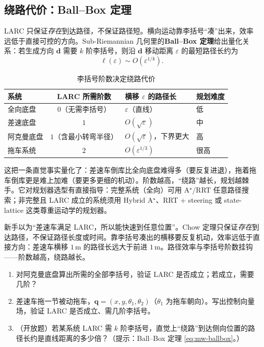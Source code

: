 \subsection{绕路代价：Ball--Box 定理}
\label{sec:mw-ballbox}

LARC 只保证\emph{存在}到达路径，不保证路径短。横向运动靠李括号“凑”出来，效率远低于直接可控的方向。Sub-Riemannian 几何里的\textbf{Ball--Box 定理}给出量化关系：若生成方向 $\mathbf{d}$ 需要 $k$ 阶李括号，则沿 $\mathbf{d}$ 移动距离 $\varepsilon$ 的最短路径长约为
\begin{equation}
  \ell(\varepsilon)\sim O\!\left(\varepsilon^{1/k}\right).
  \label{eq:mw-ballbox}
\end{equation}

\begin{table}[H]\centering\small
\caption{李括号阶数决定绕路代价}
\begin{tabular}{lcll}
\toprule
系统 & LARC 所需阶数 & 横移 $\varepsilon$ 的路径长 & 规划难度 \\
\midrule
全向底盘 & $0$（无需李括号） & $\varepsilon$（直线） & 低 \\
差速底盘 & $1$ & $O(\sqrt{\varepsilon})$ & 中 \\
阿克曼底盘 & $1$（含最小转弯半径） & $O(\sqrt{\varepsilon})$，下界更大 & 高 \\
拖车系统 & $2$ & $O(\varepsilon^{1/3})$ & 很高 \\
\bottomrule
\end{tabular}
\end{table}

\noindent 这把一条直觉事实量化了：差速车倒库比全向底盘难得多（要反复进退），拖着拖车倒库更是难上加难（要更多更细的机动）。阶数越高，“绕路”越长，规划越棘手。它对规划器选型有直接指导：完整系统（全向）可用 A$^\star$/RRT 任意路径搜索；非完整且 LARC 成立的系统须用 Hybrid A$^\star$、RRT + steering 或 state-lattice 这类尊重运动学的规划器。

\begin{pitfall}
新手以为“差速车满足 LARC，所以能快速到任意位置”。Chow 定理只保证\emph{存在}到达路径，不保证路径长度或时间。靠李括号凑出的横移要反复机动，效率远低于直接方向：差速车横移 $1$\,m 的路径长远大于前进 $1$\,m。路径效率与李括号阶数挂钩——阶数越高，绕路越长。
\end{pitfall}

\begin{practice}
\begin{enumerate}
  \item 对阿克曼底盘算出所需的全部李括号，验证 LARC 是否成立；若成立，需要几阶？
  \item 差速车拖一节被动拖车，$\mathbf{q}=(x,y,\theta_1,\theta_2)$（$\theta_1$ 为拖车朝向）。写出控制向量场，验证 LARC 是否成立、需几阶李括号。
  \item （开放题）若某系统 LARC 需 $k$ 阶李括号，直觉上“绕路”到达侧向位置的路径长约是直线距离的多少倍？（提示：Ball--Box 定理 \cref{eq:mw-ballbox}。）
\end{enumerate}
\end{practice}

